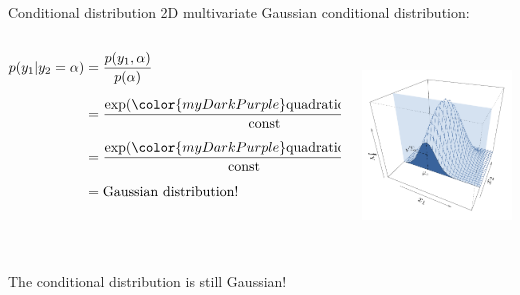 \documentclass{beamer}
\begin{document}
\begin{frame}{}
\begin{block}{Conditional distribution}
2D multivariate Gaussian conditional distribution:\\
\begin{columns}
\begin{column}{5cm}
\begin{align*}
p(y_1 | y_2=\alpha) & = \frac{p(y_1,\alpha)}{p(\alpha)}\\[2mm]
& = \frac{\exp({\color{myDarkPurple} \mathrm{quadratic\ in\ } y_1 \mathrm{\ and\ } \alpha})}{\mathrm{const}}\\[2mm]
& = \frac{\exp({\color{myDarkPurple} \mathrm{quadratic\ in\ } y_1})}{\mathrm{const}}\\[2mm]
& = \mathrm{Gaussian\ distribution!}
\end{align*}
\end{column}
\begin{column}{5cm}
\begin{center}
\includegraphics[height=5cm]{figures/ch1_condpdf1}
\end{center}
\end{column}
\end{columns}
The conditional distribution is still Gaussian!
\end{block}
\end{frame}
\end{document}
